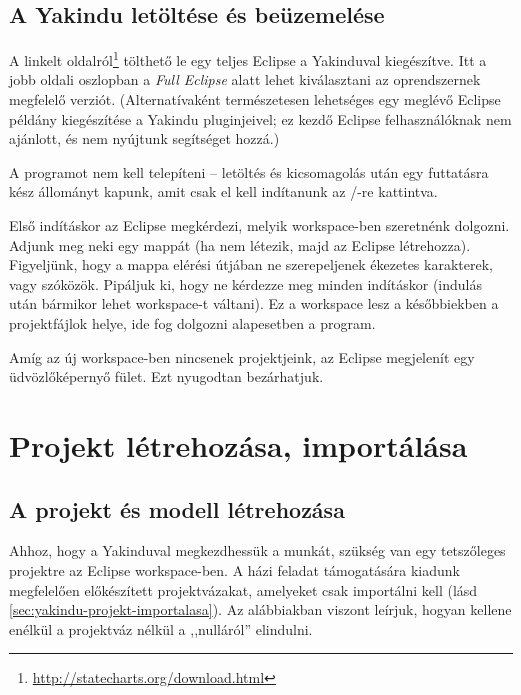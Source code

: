 \subsection{A Yakindu letöltése és beüzemelése}

A linkelt oldalról\footnote{\url{http://statecharts.org/download.html}} tölthető le egy teljes Eclipse a Yakinduval kiegészítve. Itt a jobb oldali oszlopban a \emph{Full Eclipse} alatt lehet kiválasztani az oprendszernek megfelelő verziót. (Alternatívaként természetesen lehetséges egy meglévő Eclipse példány kiegészítése a Yakindu pluginjeivel; ez kezdő Eclipse felhasználóknak nem ajánlott, és nem nyújtunk segítséget hozzá.)

A programot nem kell telepíteni -- letöltés és kicsomagolás után egy futtatásra kész állományt kapunk, amit csak el kell indítanunk az /-re kattintva.

Első indításkor az Eclipse megkérdezi, melyik workspace-ben szeretnénk dolgozni. Adjunk meg neki egy mappát (ha nem létezik, majd az Eclipse létrehozza). Figyeljünk, hogy a mappa elérési útjában ne szerepeljenek ékezetes karakterek, vagy szóközök. Pipáljuk ki, hogy ne kérdezze meg minden indításkor (indulás után bármikor lehet workspace-t váltani).
Ez a workspace lesz a későbbiekben a projektfájlok helye, ide fog dolgozni alapesetben a program.

\begin{comment}
Természetesen máshonnan is importálható projekt, illetve máshová is lehet menteni, de a workspace kényelmes megoldás arra, hogy egységes helyen tároljuk az aktuális munkáinkat.
\end{comment}

Amíg az új workspace-ben nincsenek projektjeink, az Eclipse megjelenít egy üdvözlőképernyő fület. Ezt nyugodtan bezárhatjuk.

\section{Projekt létrehozása, importálása}

\subsection{A projekt és modell létrehozása}
Ahhoz, hogy a Yakinduval megkezdhessük a munkát, szükség van egy tetszőleges projektre az Eclipse workspace-ben. A házi feladat támogatására kiadunk megfelelően előkészített projektvázakat, amelyeket csak importálni kell (lásd \ref{sec:yakindu-projekt-importalasa}). Az alábbiakban viszont leírjuk, hogyan kellene enélkül a projektváz nélkül a ,,nulláról'' elindulni.

